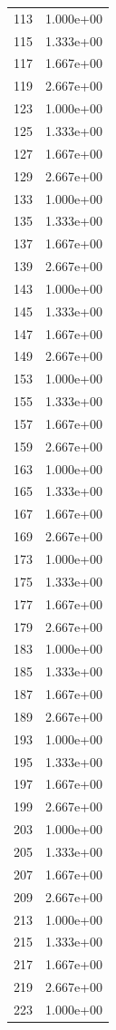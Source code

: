 \documentclass[12pt]{article}
\begin{document}
\begin{longtable}{@{}cc@{}}
113 & 1.000e+00 \\
115 & 1.333e+00 \\
117 & 1.667e+00 \\
119 & 2.667e+00 \\
123 & 1.000e+00 \\
125 & 1.333e+00 \\
127 & 1.667e+00 \\
129 & 2.667e+00 \\
133 & 1.000e+00 \\
135 & 1.333e+00 \\
137 & 1.667e+00 \\
139 & 2.667e+00 \\
143 & 1.000e+00 \\
145 & 1.333e+00 \\
147 & 1.667e+00 \\
149 & 2.667e+00 \\
153 & 1.000e+00 \\
155 & 1.333e+00 \\
157 & 1.667e+00 \\
159 & 2.667e+00 \\
163 & 1.000e+00 \\
165 & 1.333e+00 \\
167 & 1.667e+00 \\
169 & 2.667e+00 \\
173 & 1.000e+00 \\
175 & 1.333e+00 \\
177 & 1.667e+00 \\
179 & 2.667e+00 \\
183 & 1.000e+00 \\
185 & 1.333e+00 \\
187 & 1.667e+00 \\
189 & 2.667e+00 \\
193 & 1.000e+00 \\
195 & 1.333e+00 \\
197 & 1.667e+00 \\
199 & 2.667e+00 \\
203 & 1.000e+00 \\
205 & 1.333e+00 \\
207 & 1.667e+00 \\
209 & 2.667e+00 \\
213 & 1.000e+00 \\
215 & 1.333e+00 \\
217 & 1.667e+00 \\
219 & 2.667e+00 \\
223 & 1.000e+00 \\

\end{longtable}
\end{document}
